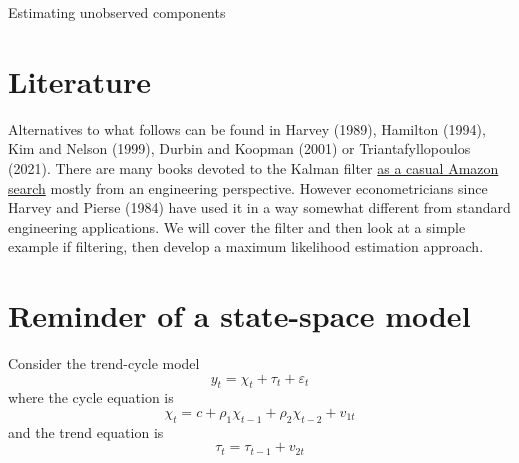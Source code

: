 \documentclass[
  letterpaper,
]{book}
\begin{document}
Estimating unobserved components

\hfill\break

\hypertarget{literature}{%
\section{Literature}\label{literature}}

Alternatives to what follows can be found in Harvey (1989), Hamilton
(1994), Kim and Nelson (1999), Durbin and Koopman (2001) or
Triantafyllopoulos (2021). There are many books devoted to the Kalman
filter
\href{https://www.amazon.co.uk/s?k=kalman+filtering\&i=stripbooks}{as a
casual Amazon search} mostly from an engineering perspective. However
econometricians since Harvey and Pierse (1984) have used it in a way
somewhat different from standard engineering applications. We will cover
the filter and then look at a simple example if filtering, then develop
a maximum likelihood estimation approach.

\hypertarget{reminder-of-a-state-space-model}{%
\section{Reminder of a state-space
model}\label{reminder-of-a-state-space-model}}

Consider the trend-cycle model \begin{equation}
  y_t = \chi_t + \tau_t + \varepsilon_t
\end{equation} where the cycle equation is \begin{equation}
  \chi_t = c+\rho_1 \chi_{t-1} + \rho_2 \chi_{t-2}+v_{1t}
\end{equation} and the trend equation is \begin{equation}
  \tau_t = \tau_{t-1} + v_{2t}
\end{equation}
\end{document}
